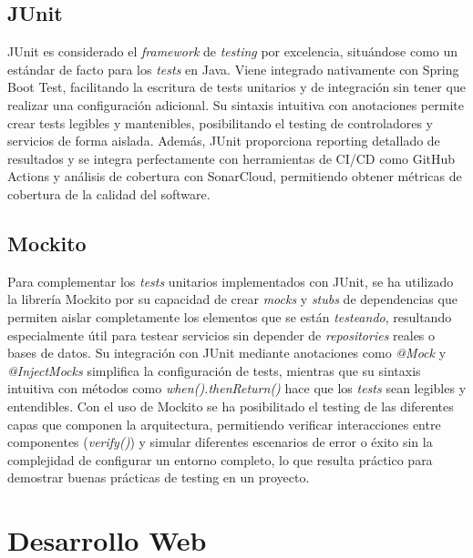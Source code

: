 \subsection{JUnit}\label{junit}
JUnit es considerado el \emph{framework} de \emph{testing} por excelencia, situándose como un estándar de facto para los \emph{tests} en Java. Viene integrado nativamente con Spring Boot Test, facilitando la escritura de tests unitarios y de integración sin tener que realizar una configuración adicional. Su sintaxis intuitiva con anotaciones permite crear tests legibles y mantenibles, posibilitando el testing de controladores y servicios de forma aislada. Además, JUnit proporciona reporting detallado de resultados y se integra perfectamente con herramientas de CI/CD como GitHub Actions y análisis de cobertura con SonarCloud, permitiendo obtener métricas de cobertura de la calidad del software.

\subsection{Mockito}\label{mockito}
Para complementar los \emph{tests} unitarios implementados con JUnit, se ha utilizado la librería Mockito por su capacidad de crear \emph{mocks} y \emph{stubs} de dependencias que permiten aislar completamente los elementos que se están \emph{testeando}, resultando especialmente útil para testear servicios sin depender de \emph{repositories} reales o bases de datos. Su integración con JUnit mediante anotaciones como \emph{@Mock} y \emph{@InjectMocks} simplifica la configuración de tests, mientras que su sintaxis intuitiva con métodos como \emph{when().thenReturn()} hace que los \emph{tests} sean legibles y entendibles. Con el uso de Mockito se ha posibilitado el testing de las diferentes capas que componen la arquitectura, permitiendo verificar interacciones entre componentes (\emph{verify()}) y simular diferentes escenarios de error o éxito sin la complejidad de configurar un entorno completo, lo que resulta práctico para demostrar buenas prácticas de testing en un proyecto.

\newpage

\section{Desarrollo Web}\label{desarrollo-web}

